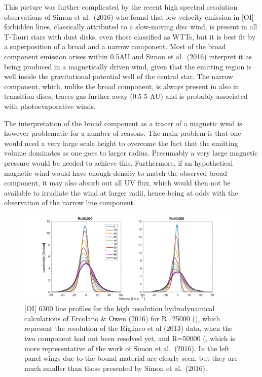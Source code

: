 \documentclass[10pt,fleqn,twoside]{article}
\begin{document}
This picture was further complicated by the recent high spectral
resolution observations of  Simon et al.\ (2016)  who found that low velocity
emission in [OI] forbidden lines, classically attributed to a
slow-moving disc wind, is present in all T-Tauri stars with
dust disks, even those classified as WTTs, but it is best fit
by a superposition of a broad and a narrow component. 
Most of the broad component emission
arises within 0.5AU and Simon et al.\ (2016) interpret it
as being produced in a magnetically driven wind, given that the
emitting region is well inside the gravitational 
potential well 
of the central star. The narrow component, which, unlike the broad
component, is always present in also in transition
discs, traces gas further away (0.5-5 AU) and is probably associated
with photoevaporative winds.

The interpretation of the broad component as a tracer of a magnetic
wind is however problematic for a number of reasons. The main problem
is that one would need a very large scale height to overcome the fact
that the emitting volume dominates as one goes to larger
radius. Presumably a very large magnetic pressure would be needed to
achieve this. Furthermore, if an hypothetical magnetic wind would
have enough density to match the observed broad component, it may also absorb
out all UV flux, which would then not be available to irradiate the
wind at larger radii, hence being at odds with the observation of the
narrow line component. 

 \begin{figure}
   \centering
   \includegraphics[width=0.97\textwidth]{lines_both.pdf}
  
   \caption{[OI] 6300 line
profiles for the high resolution hydrodynamical calculations of
Ercolano \& Owen (2016) for R=25000 (), 
which represent the resolution of the
Rigliaco et al (2013) data, when the two component had not been
resolved yet, and R=50000 (, which is more representative
of the work of Simon et al.\ (2016). In the left panel wings due to the
bound material are clearly seen, but they are much smaller than those
presented by Simon et al.\ (2016).
}
              \label{fig:wings}
    \end{figure}
\end{document}
